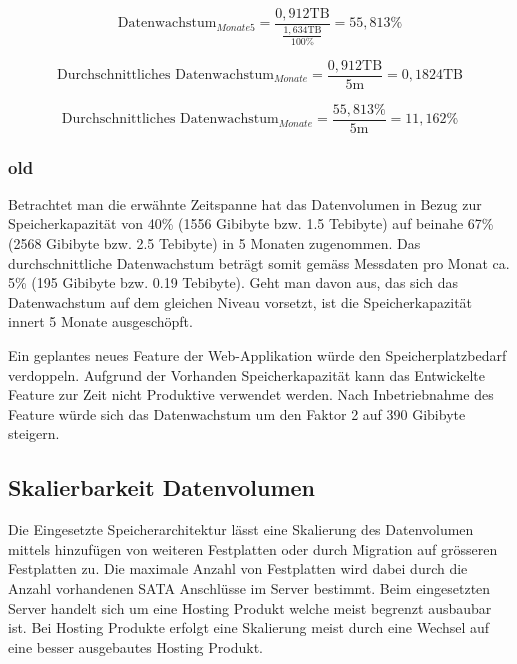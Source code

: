\begin{equation}
\mbox{Datenwachstum}_{Monate5} = \frac{0,912 \mathrm{TB}}{\frac{1,634 \mathrm{TB}}{100 \%}} =  55,813\%
\label{eqn:Verfügbarkeit_5Monate_in_Prozent}
\end{equation}

\begin{equation}
\mbox{Durchschnittliches Datenwachstum}_{Monate} = \frac{0,912 \mathrm{TB}}{5\mathrm{m}} =  0,1824 \mathrm{TB}
\label{eqn:Verfügbarkeit_1Monate}
\end{equation}

\begin{equation}
\mbox{Durchschnittliches Datenwachstum}_{Monate} = \frac{55,813\%}{5 \mathrm{m}} = 11,162\%
\label{eqn:Verfügbarkeit_1Monate_in_Prozent}
\end{equation}

\subsubsection{old}
Betrachtet man die erwähnte Zeitspanne hat das Datenvolumen in Bezug zur Speicherkapazität von 40\% (1556 Gibibyte bzw. 1.5 Tebibyte) auf beinahe 67\% (2568 Gibibyte bzw. 2.5 Tebibyte) in 5 Monaten zugenommen. Das durchschnittliche Datenwachstum beträgt somit gemäss Messdaten pro Monat ca. 5\% (195 Gibibyte bzw. 0.19 Tebibyte). Geht man davon aus, das sich das Datenwachstum auf dem gleichen Niveau vorsetzt, ist die Speicherkapazität innert 5 Monate ausgeschöpft.

Ein geplantes neues Feature der Web-Applikation würde den Speicherplatzbedarf verdoppeln. Aufgrund der Vorhanden Speicherkapazität kann das Entwickelte Feature zur Zeit nicht Produktive verwendet werden. Nach Inbetriebnahme des Feature würde sich das Datenwachstum um den Faktor 2 auf 390 Gibibyte steigern.

\subsection{Skalierbarkeit Datenvolumen}\label{AnalyseSkalierbarkeitDatenvolumen}
Die Eingesetzte Speicherarchitektur lässt eine Skalierung des Datenvolumen mittels hinzufügen von weiteren Festplatten oder durch Migration auf grösseren Festplatten zu. Die maximale Anzahl von Festplatten wird dabei durch die Anzahl vorhandenen SATA Anschlüsse im Server bestimmt. Beim eingesetzten Server handelt sich um eine Hosting Produkt welche meist begrenzt ausbaubar ist. Bei Hosting Produkte erfolgt eine Skalierung meist durch eine Wechsel auf eine besser ausgebautes Hosting Produkt. 

